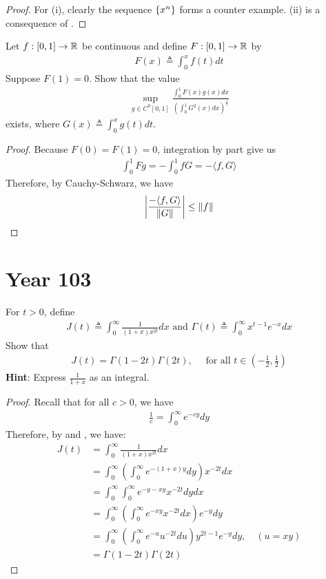 \documentclass{report}
\begin{document}
\begin{proof}
For (i), clearly the sequence $\left\{ x^n \right\}$ forms a counter example. (ii) is a consequence of . 
\end{proof}
\begin{question}{}{}
Let $f:[0,1]\rightarrow \mathbb{R}$ be continuous and define $F:[0,1]\rightarrow \mathbb{R}$ by 
\begin{align*}
F(x)\triangleq \int_0^x f(t)dt
\end{align*}
Suppose $F(1)=0$. Show that the value
\begin{align*}
\sup_{g \in C^0[0,1]}  \frac{\int_0^1 F(x)g(x)dx}{\left(\int_0^1 G^2(x)dx \right)^{\frac{1}{2}}}
\end{align*}
exists, where $G(x)\triangleq \int_0^x g(t)dt$. 
\end{question}
\begin{proof}
Because $F(0)=F(1)=0$, integration by part give us 
\begin{align*}
\int_0^1 Fg = -\int_0^1 fG = - \langle f,G\rangle 
\end{align*}
Therefore, by Cauchy-Schwarz, we have 
\begin{align*}
  \left|\frac{-\langle f,G\rangle }{\left\| G \right\|}\right|\leq \left\| f \right\|
\end{align*}
\end{proof}
\section{Year 103}
\begin{question}{}{}
For $t>0$, define 
 \begin{align*}
J(t)\triangleq \int_{0}^{\infty} \frac{1}{(1+x)x^{2t}} dx \text{ and } \Gamma (t)\triangleq \int_{0}^{\infty} x^{t-1}e^{-x}dx
\end{align*}
Show that 
\begin{align*}
J(t)= \Gamma (1-2t) \Gamma (2t),\quad \text{ for all } t \in \left(-\frac{1}{2}, \frac{1}{2} \right)
\end{align*}
\textbf{Hint}: Express $\frac{1}{1+x}$ as an integral. 
\end{question}
\begin{proof}
Recall that for all $c>0$, we have 
\begin{align*}
\frac{1}{c}=\int_0^{\infty} e^{-cy} dy
\end{align*}
Therefore, by  and , we have:  
\begin{align*}
J(t)&= \int_0^{\infty} \frac{1}{(1+x)x^{2t}}dx \\
&= \int_0^{\infty}  \left(\int_0^{\infty} e^{-(1+x)y}dy \right)  x^{-2t} dx  \\
&=\int_0^{\infty} \int_0^{\infty} e^{-y -xy} x^{-2t}dydx \\
&= \int_0^{\infty} \left(\int_0^{\infty} e^{-xy}x^{-2t} dx \right) e^{-y}dy  \\
&=\int_0^{\infty} \left(\int_0^{\infty} e^{-u}u^{-2t} du\right)   y^{2t-1} e^{-y}dy,\quad (u=xy)  \\
&=\Gamma (1-2t) \Gamma (2t) 
\end{align*}
\end{proof}
\end{document}
